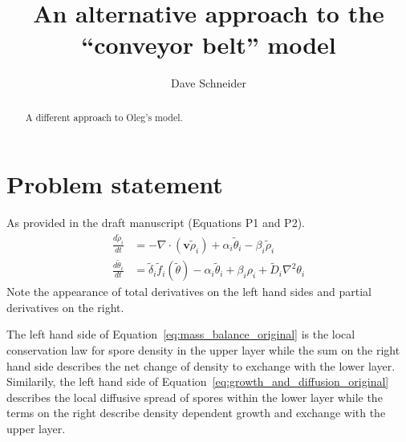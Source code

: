 \documentclass[12pt]{amsart}
\begin{document}
\author{Dave Schneider}
\address{Plant-Microbe Interaction Research Unit\\
  R.W.\ Holley Center \\
  USDA Agricultural Research Service \\
  538 Tower Road \\ Ithaca, NY 14583}

\title{An alternative approach to the ``conveyor belt'' model}


\maketitle


\begin{abstract}
  A different approach to Oleg's model.
\end{abstract}


\section{Problem statement}

As provided in the draft manuscript (Equations P1 and P2).
\begin{subequations}
\begin{align}
  \frac{d\tilde{\rho}_i}{dt} & = -\nabla \cdot (\mathbf{v}\tilde{\rho}_{i}) +
  \alpha_{i} \tilde{\theta}_{i} -
  \beta_{i}\tilde{\rho}_{i} \label{eq:mass_balance_original}\\
  \frac{d\tilde{\theta}_i}{dt} & = \tilde{\delta}_{i}  \tilde{f}_i(\tilde{\theta}) -
  \alpha_{i} \tilde{\theta}_{i} +
  \beta_{i}\rho_i +
  \tilde{D}_{i}\nabla^2\theta_{i} \label{eq:growth_and_diffusion_original}
\end{align}
\end{subequations}
Note the appearance of total derivatives on the left hand sides and
partial derivatives on the right.  

The left hand side of Equation~\ref{eq:mass_balance_original} is the 
local conservation law for spore density in the upper layer while
the sum on the right hand side describes the net change of density to
exchange with the lower layer.  Similarily, the left hand side of
Equation~\ref{eq:growth_and_diffusion_original} describes the local diffusive
spread of spores within the lower layer while the terms on the right
describe density dependent growth and exchange with the upper layer.  
\end{document}
